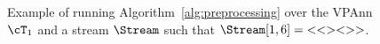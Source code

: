 \begin{figure}[t]
\begin{tikzpicture}[xscale=1.0,->,>=stealth',shorten >=1pt,auto,node distance=2cm,thick,inner sep=0.5pt, rectangle]
	\end{tikzpicture}
	\caption{Example of running Algorithm~\ref{alg:preprocessing} over the VPAnn $\cT_1$ and a stream $\Stream$ such that $\Stream[1,6] = {\tt < < > < > >}$.}
	\label{nested:fig-alg-ex}
\end{figure}